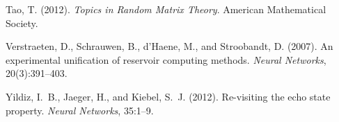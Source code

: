 \documentclass{article}
\begin{document}
\begin{thebibliography}{10}
Tao, T. (2012).
\newblock \emph{Topics in Random Matrix Theory}.
\newblock American Mathematical Society.

Verstraeten, D., Schrauwen, B., d'Haene, M., and Stroobandt, D. (2007).
\newblock An experimental unification of reservoir computing methods.
\newblock \emph{Neural Networks}, 20(3):391--403.

Yildiz, I.~B., Jaeger, H., and Kiebel, S.~J. (2012).
\newblock Re-visiting the echo state property.
\newblock \emph{Neural Networks}, 35:1--9.

\end{thebibliography}
\end{document}

